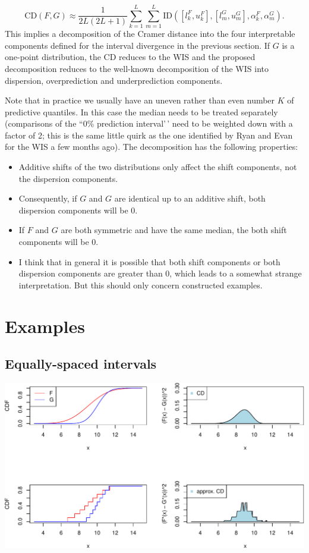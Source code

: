 \documentclass[
]{article}
\begin{document}
\[
\text{CD}(F, G) \approx \frac{1}{2L(2L + 1)}\sum_{k = 1}^L\sum_{m = 1}^L \text{ID}([l^F_k, u^F_k], [l^G_m, u^G_m], \alpha_k^F, \alpha_m^G).
\] This implies a decomposition of the Cramer distance into the four
interpretable components defined for the interval divergence in the
previous section. If \(G\) is a one-point distribution, the CD reduces
to the WIS and the proposed decomposition reduces to the well-known
decomposition of the WIS into dispersion, overprediction and
underprediction components.

Note that in practice we usually have an uneven rather than even number
\(K\) of predictive quantiles. In this case the median needs to be
treated separately (comparisons of the ``0\% prediction interval'\,'
need to be weighted down with a factor of 2; this is the same little
quirk as the one identified by Ryan and Evan for the WIS a few months
ago). The decomposition has the following properties:

\begin{itemize}
\item Additive shifts of the two distributions only affect the shift components, not the dispersion components.
\item Consequently, if $G$ and $G$ are identical up to an additive shift, both dispersion components will be 0.
\item If $F$ and $G$ are both symmetric and have the same median, the both shift components will be 0.
\item I think that in general it is possible that both shift components or both dispersion components are greater than 0, which leads to a somewhat strange interpretation. But this should only concern constructed examples.
\end{itemize}

\hypertarget{examples}{%
\section{Examples}\label{examples}}

\hypertarget{equally-spaced-intervals}{%
\subsection{Equally-spaced intervals}\label{equally-spaced-intervals}}

\includegraphics{cd_approx_2_files/figure-latex/unnamed-chunk-2-1.pdf}
\end{document}

